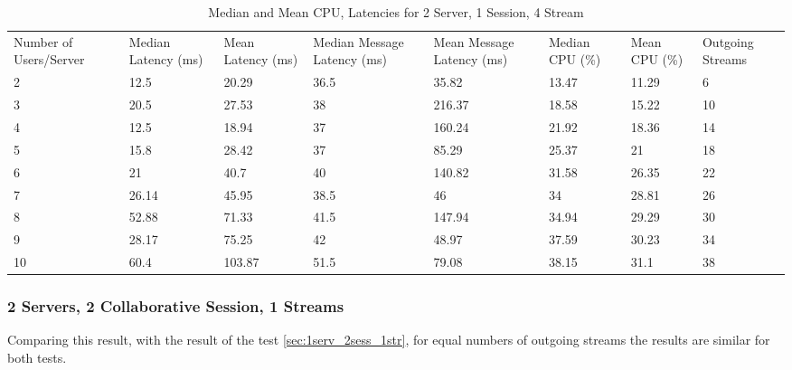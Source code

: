 \begin{table}
\caption{Median and Mean CPU, Latencies for 2 Server, 1 Session, 4 Stream}
\label{table:2serv_1sess_4str}
\begin{tabu} to\linewidth{|X[c]|X[c]|X[c]|X[c]|X[c]|X[c]|X[c]|X[c]|}
\everyrow{\hline}
\hline
Number of Users/Server & Median Latency (ms) & Mean Latency (ms) & Median Message Latency (ms) & Mean Message Latency (ms) & Median CPU (\%) & Mean CPU (\%) & Outgoing Streams\\
2 & 12.5 & 20.29 & 36.5 & 35.82 & 13.47 & 11.29 & 6 \\
3 & 20.5 & 27.53 & 38 & 216.37 & 18.58 & 15.22 & 10 \\
4 & 12.5 & 18.94 & 37 & 160.24 & 21.92 & 18.36 & 14 \\
5 & 15.8 & 28.42 & 37 & 85.29 & 25.37 & 21 & 18 \\
6 & 21 & 40.7 & 40 & 140.82 & 31.58 & 26.35 & 22 \\
7 & 26.14 & 45.95 & 38.5 & 46 & 34 & 28.81 & 26 \\
8 & 52.88 & 71.33 & 41.5 & 147.94 & 34.94 & 29.29 & 30 \\
9 & 28.17 & 75.25 & 42 & 48.97 & 37.59 & 30.23 & 34 \\
10 & 60.4 & 103.87 & 51.5 & 79.08 & 38.15 & 31.1 & 38 \\
\end{tabu}
\end{table}

\clearpage\subsubsection{2 Servers, 2 Collaborative Session, 1 Streams}

Comparing this result, with the result of the test \ref{sec:1serv_2sess_1str}, for equal numbers of outgoing streams the results are similar for both tests.

